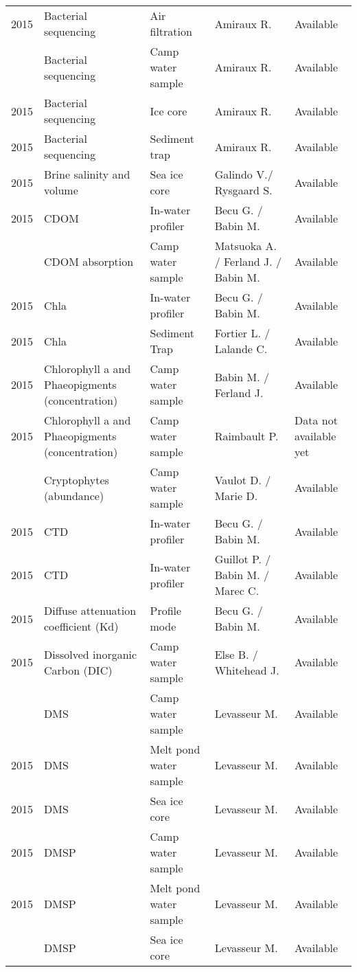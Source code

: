 \documentclass[]{article}
\begin{document}
\begin{landscape}
\begin{longtable}{rllll}
2015 & Bacterial sequencing & Air filtration & Amiraux R. & Available\\
\addlinespace
2015 & Bacterial sequencing & Camp water sample & Amiraux R. & Available\\
2015 & Bacterial sequencing & Ice core & Amiraux R. & Available\\
2015 & Bacterial sequencing & Sediment trap & Amiraux R. & Available\\
2015 & Brine salinity and volume & Sea ice core & Galindo V./ Rysgaard S. & Available\\
2015 & CDOM & In-water profiler & Becu G. / Babin M. & Available\\
\addlinespace
2015 & CDOM absorption & Camp water sample & Matsuoka A. / Ferland J. / Babin M. & Available\\
2015 & Chla & In-water profiler & Becu G. / Babin M. & Available\\
2015 & Chla & Sediment Trap & Fortier L. / Lalande C. & Available\\
2015 & Chlorophyll a and Phaeopigments (concentration) & Camp water sample & Babin M. / Ferland J. & Available\\
2015 & Chlorophyll a and Phaeopigments (concentration) & Camp water sample & Raimbault P. & Data not available yet\\
\addlinespace
2015 & Cryptophytes (abundance) & Camp water sample & Vaulot D. / Marie D. & Available\\
2015 & CTD & In-water profiler & Becu G. / Babin M. & Available\\
2015 & CTD & In-water profiler & Guillot P. / Babin M. / Marec C. & Available\\
2015 & Diffuse attenuation coefficient (Kd) & Profile mode & Becu G. / Babin M. & Available\\
2015 & Dissolved inorganic Carbon (DIC) & Camp water sample & Else B. / Whitehead J. & Available\\
\addlinespace
2015 & DMS & Camp water sample & Levasseur M. & Available\\
2015 & DMS & Melt pond water sample & Levasseur M. & Available\\
2015 & DMS & Sea ice core & Levasseur M. & Available\\
2015 & DMSP & Camp water sample & Levasseur M. & Available\\
2015 & DMSP & Melt pond water sample & Levasseur M. & Available\\
\addlinespace
2015 & DMSP & Sea ice core & Levasseur M. & Available\\

\end{longtable}
\end{landscape}
\end{document}
